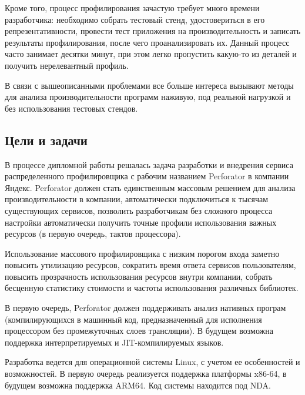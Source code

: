 Кроме того, процесс профилирования зачастую требует много времени разработчика: необходимо собрать тестовый стенд, удостовериться в его репрезентативности, провести тест приложения на производительность и записать результаты профилирования, после чего проанализировать их. Данный процесс часто занимает десятки минут, при этом легко пропустить какую-то из деталей и получить нерелевантный профиль.

В связи с вышеописанными проблемами все больше интереса вызывают методы для анализа производительности программ наживую, под реальной нагрузкой и без использования тестовых стендов.

\subsection{Цели и задачи}
В процессе дипломной работы решалась задача разработки и внедрения сервиса распределенного профилировщика
с рабочим названием Perforator в компании Яндекс.
Perforator должен стать единственным массовым решением для анализа производительности в компании,
автоматически подключиться к тысячам существующих сервисов,
позволить разработчикам без сложного процесса настройки автоматически получить точные профили использования важных ресурсов
(в первую очередь, тактов процессора).

Использование массового профилировщика с низким порогом входа заметно повысить утилизацию ресурсов, сократить время ответа сервисов пользователям, повысить прозрачность использования ресурсов внутри компании, собрать бесценную статистику стоимости и частоты использования различных библиотек.

В первую очередь, Perforator должен поддерживать анализ нативных програм (компилирующихся в машинный код, предназначенный для исполнения процессором без промежуточных слоев трансляции). В будущем возможна поддержка интерпретируемых и JIT-компилируемых языков.

Разработка ведется для операционной системы Linux, с учетом ее особенностей и возможностей.
В первую очередь реализуется поддержка платформы x86-64, в будущем возможна поддержка ARM64.
Код системы находится под NDA.
